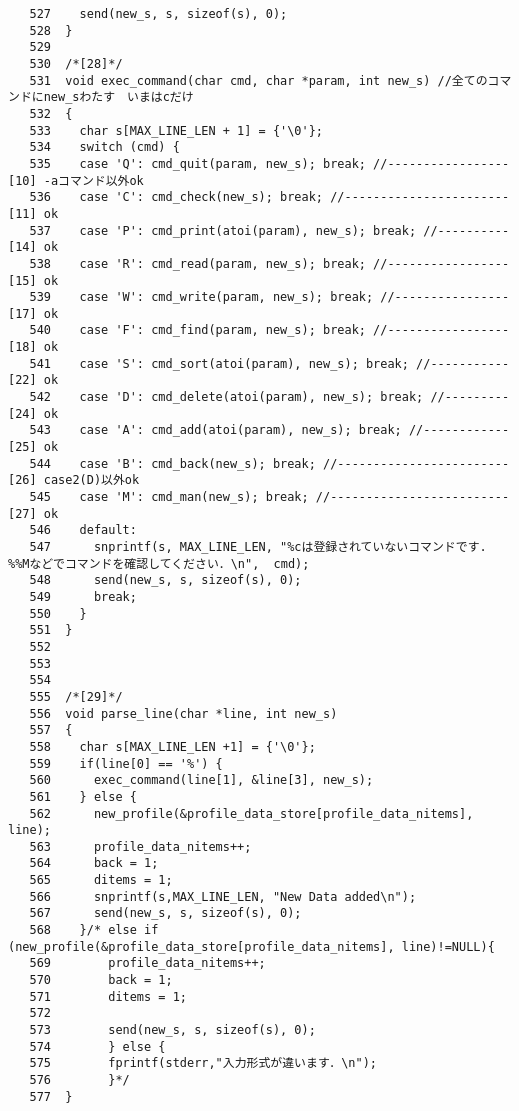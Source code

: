 \documentclass[a4j]{jarticle}
\begin{document}
\begin{verbatim}
   527	  send(new_s, s, sizeof(s), 0);
   528	}
   529	
   530	/*[28]*/
   531	void exec_command(char cmd, char *param, int new_s) //全てのコマンドにnew_sわたす　いまはcだけ
   532	{
   533	  char s[MAX_LINE_LEN + 1] = {'\0'};
   534	  switch (cmd) {
   535	  case 'Q': cmd_quit(param, new_s); break; //-----------------[10] -aコマンド以外ok
   536	  case 'C': cmd_check(new_s); break; //-----------------------[11] ok
   537	  case 'P': cmd_print(atoi(param), new_s); break; //----------[14] ok
   538	  case 'R': cmd_read(param, new_s); break; //-----------------[15] ok
   539	  case 'W': cmd_write(param, new_s); break; //----------------[17] ok
   540	  case 'F': cmd_find(param, new_s); break; //-----------------[18] ok
   541	  case 'S': cmd_sort(atoi(param), new_s); break; //-----------[22] ok
   542	  case 'D': cmd_delete(atoi(param), new_s); break; //---------[24] ok 
   543	  case 'A': cmd_add(atoi(param), new_s); break; //------------[25] ok
   544	  case 'B': cmd_back(new_s); break; //------------------------[26] case2(D)以外ok
   545	  case 'M': cmd_man(new_s); break; //-------------------------[27] ok
   546	  default:
   547	    snprintf(s, MAX_LINE_LEN, "%cは登録されていないコマンドです. %%Mなどでコマンドを確認してください．\n",  cmd);
   548	    send(new_s, s, sizeof(s), 0);
   549	    break;
   550	  }
   551	}
   552	
   553	
   554	
   555	/*[29]*/
   556	void parse_line(char *line, int new_s)
   557	{
   558	  char s[MAX_LINE_LEN +1] = {'\0'};
   559	  if(line[0] == '%') {
   560	    exec_command(line[1], &line[3], new_s);
   561	  } else {
   562	    new_profile(&profile_data_store[profile_data_nitems], line);
   563	    profile_data_nitems++;
   564	    back = 1;
   565	    ditems = 1;
   566	    snprintf(s,MAX_LINE_LEN, "New Data added\n");
   567	    send(new_s, s, sizeof(s), 0);
   568	  }/* else if (new_profile(&profile_data_store[profile_data_nitems], line)!=NULL){
   569	      profile_data_nitems++;
   570	      back = 1;
   571	      ditems = 1;
   572	      
   573	      send(new_s, s, sizeof(s), 0);
   574	      } else {
   575	      fprintf(stderr,"入力形式が違います．\n");
   576	      }*/
   577	}
\end{verbatim}

\newpage
\end{document}
